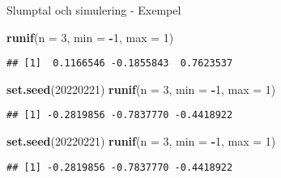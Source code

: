 \documentclass[
  11pt,
  ignorenonframetext,
  handout]{beamer}
\newenvironment{Shaded}{\begin{snugshade}}{\end{snugshade}}
\newcommand{\AttributeTok}[1]{\textcolor[rgb]{0.13,0.29,0.53}{#1}}
\newcommand{\DecValTok}[1]{\textcolor[rgb]{0.00,0.00,0.81}{#1}}
\newcommand{\FunctionTok}[1]{\textcolor[rgb]{0.13,0.29,0.53}{\textbf{#1}}}
\newcommand{\NormalTok}[1]{#1}
\newcommand{\SpecialCharTok}[1]{\textcolor[rgb]{0.81,0.36,0.00}{\textbf{#1}}}
\begin{document}
\begin{frame}[fragile]{Slumptal och simulering - Exempel}
\label{slumptal-och-simulering---exempel}
\begin{Shaded}
\begin{Highlighting}[]
\FunctionTok{runif}\NormalTok{(}\AttributeTok{n =} \DecValTok{3}\NormalTok{, }\AttributeTok{min =} \SpecialCharTok{{-}}\DecValTok{1}\NormalTok{, }\AttributeTok{max =} \DecValTok{1}\NormalTok{)}
\end{Highlighting}
\end{Shaded}

\pause

\begin{verbatim}
## [1]  0.1166546 -0.1855843  0.7623537
\end{verbatim}

\pause

\begin{Shaded}
\begin{Highlighting}[]
\FunctionTok{set.seed}\NormalTok{(}\DecValTok{20220221}\NormalTok{)}
\FunctionTok{runif}\NormalTok{(}\AttributeTok{n =} \DecValTok{3}\NormalTok{, }\AttributeTok{min =} \SpecialCharTok{{-}}\DecValTok{1}\NormalTok{, }\AttributeTok{max =} \DecValTok{1}\NormalTok{)}
\end{Highlighting}
\end{Shaded}

\pause

\begin{verbatim}
## [1] -0.2819856 -0.7837770 -0.4418922
\end{verbatim}

\pause

\begin{Shaded}
\begin{Highlighting}[]
\FunctionTok{set.seed}\NormalTok{(}\DecValTok{20220221}\NormalTok{)}
\FunctionTok{runif}\NormalTok{(}\AttributeTok{n =} \DecValTok{3}\NormalTok{, }\AttributeTok{min =} \SpecialCharTok{{-}}\DecValTok{1}\NormalTok{, }\AttributeTok{max =} \DecValTok{1}\NormalTok{)}
\end{Highlighting}
\end{Shaded}

\pause

\begin{verbatim}
## [1] -0.2819856 -0.7837770 -0.4418922
\end{verbatim}
\end{frame}
\end{document}
